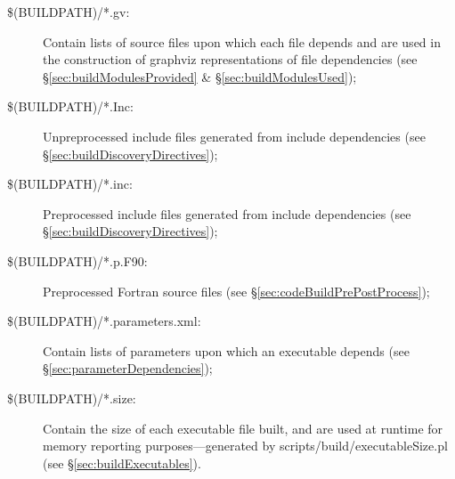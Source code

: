 \begin{description}
\item[{\normalfont \ttfamily \$(BUILDPATH)/*.gv}:] Contain lists of source files upon which each file depends and are used in the construction of \gls{graphviz} representations of file dependencies (see \S\ref{sec:buildModulesProvided} \& \S\ref{sec:buildModulesUsed});

\item[{\normalfont \ttfamily \$(BUILDPATH)/*.Inc}:] Unpreprocessed include files generated from {\normalfont \ttfamily include} dependencies (see \S\ref{sec:buildDiscoveryDirectives});

\item[{\normalfont \ttfamily \$(BUILDPATH)/*.inc}:] Preprocessed include files generated from {\normalfont \ttfamily include} dependencies (see \S\ref{sec:buildDiscoveryDirectives});

\item[{\normalfont \ttfamily \$(BUILDPATH)/*.p.F90}:] Preprocessed Fortran source files (see \S\ref{sec:codeBuildPrePostProcess});

\item[{\normalfont \ttfamily \$(BUILDPATH)/*.parameters.xml}:] Contain lists of parameters upon which an executable depends (see \S\ref{sec:parameterDependencies});

\item[{\normalfont \ttfamily \$(BUILDPATH)/*.size}:] Contain the size of each executable file built, and are used at runtime for memory reporting purposes---generated by {\normalfont \ttfamily scripts/build/executableSize.pl} (see \S\ref{sec:buildExecutables}).
\end{description}
